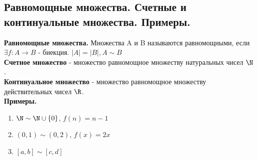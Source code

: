 \subsection{Равномощные множества. Счетные и континуальные множества. Примеры.}
\textbf{Равномощные множества.} Множества A и B называются равномощными, если $\exists f : A \to B$ - биекция. $|A| = |B|, A \sim B$\\

\textbf{Счетное множество} - множество равномощное множеству натуральных чисел $\N$.\\

\textbf{Континуальное множество} - множество равномощное множеству действительных чисел $\R$.\\

\textbf{Примеры.}

\begin{enumerate}
    \item $\N \sim \N \cup \{0\}$, $f(n) = n - 1$
    \item $(0, 1) \sim (0, 2)$,  $f(x) = 2x$
    \item $[a, b] \sim [c, d]$
\end{enumerate}